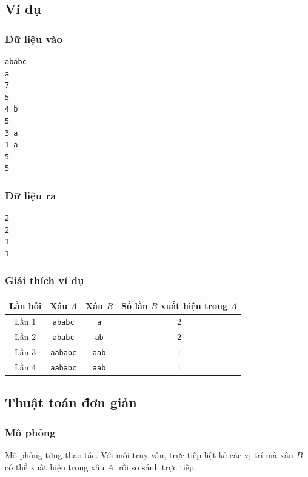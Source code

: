 \documentclass[11pt]{article}
\begin{document}
\subsection{Ví dụ}

\subsubsection{Dữ liệu vào}

\begin{verbatim}
ababc
a
7
5
4 b
5
3 a
1 a
5
5
\end{verbatim}

\subsubsection{Dữ liệu ra}

\begin{verbatim}
2
2
1
1
\end{verbatim}

\subsubsection{Giải thích ví dụ}

\begin{center}
\begin{tabular}{c c c c}
\textbf{Lần hỏi} & \textbf{Xâu \(A\)} & \textbf{Xâu \(B\)}
& \textbf{Số lần \(B\) xuất hiện trong \(A\)} \\
\hline
Lần \(1\) & \texttt{ababc} & \texttt{a} & \(2\) \\
Lần \(2\) & \texttt{ababc} & \texttt{ab} & \(2\) \\
Lần \(3\) & \texttt{aababc} & \texttt{aab} & \(1\) \\
Lần \(4\) & \texttt{aababc} & \texttt{aab} & \(1\)
\end{tabular}
\end{center}

\subsection{Thuật toán đơn giản}

\subsubsection{Mô phỏng}

Mô phỏng từng thao tác. Với mỗi truy vấn, trực tiếp liệt kê các vị trí mà
xâu \(B\) có thể xuất hiện trong xâu \(A\), rồi so sánh trực tiếp.
\end{document}
